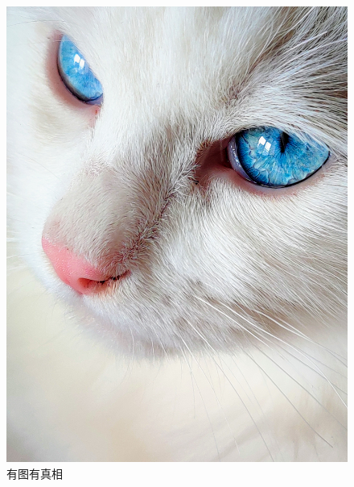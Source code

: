 \documentclass[UTF8]{ctexart}
\begin{document}
\begin{figure}[htbp]
\centering
\includegraphics[width = .8\textwidth]{a.jpg}
\caption{有图有真相}
\label{fig:myphoto}
\end{figure}
\end{document}

